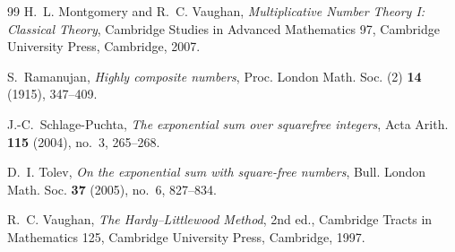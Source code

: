 \documentclass[11pt]{amsart}
\numberwithin{equation}{section}
\numberwithin{figure}{section}
\theoremstyle{definition}
\begin{document}
\begin{thebibliography}{99}
H.~L. Montgomery and R.~C. Vaughan,
\emph{Multiplicative Number Theory I: Classical Theory},
Cambridge Studies in Advanced Mathematics 97,
Cambridge University Press, Cambridge, 2007.

S.~Ramanujan,
\emph{Highly composite numbers},
Proc. London Math. Soc. (2) \textbf{14} (1915), 347--409.

J.-C.~Schlage-Puchta,
\emph{The exponential sum over squarefree integers},
Acta Arith. \textbf{115} (2004), no.~3, 265--268.

D.~I. Tolev,
\emph{On the exponential sum with square-free numbers},
Bull. London Math. Soc. \textbf{37} (2005), no.~6, 827--834.

R.~C. Vaughan,
\emph{The Hardy--Littlewood Method},
2nd ed., Cambridge Tracts in Mathematics 125,
Cambridge University Press, Cambridge, 1997.

\end{thebibliography}
\end{document}
